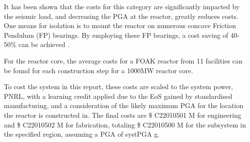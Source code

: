 It has been shown \cite{lal2022towards} that the costs for this category are significantly impacted by the seismic load, and decreasing the PGA at the reactor, greatly reduces costs. One means for isolation is to mount the reactor on numerous concave Friction Pendulum (FP) bearings. By employing these FP bearings, a cost saving of 40-50\% can be achieved \cite{lal2022towards}.

For the reactor core, the average costs for a FOAK reactor from 11 facilities can be found for each construction step for a 1000MW reactor core.

To cost the system in this report, these costs are scaled to the system power, PNRL, with a learning credit applied due to the EoS gained by standardised manufacturing, and a consideration of the likely maximum PGA for the location the reactor is constructed in. The final costs are \$ C22010501 M for engineering and \$ C22010502 M for fabrication, totaling \$ C22010500 M for the subsystem in the specified region, assuming a PGA of systPGA g.
